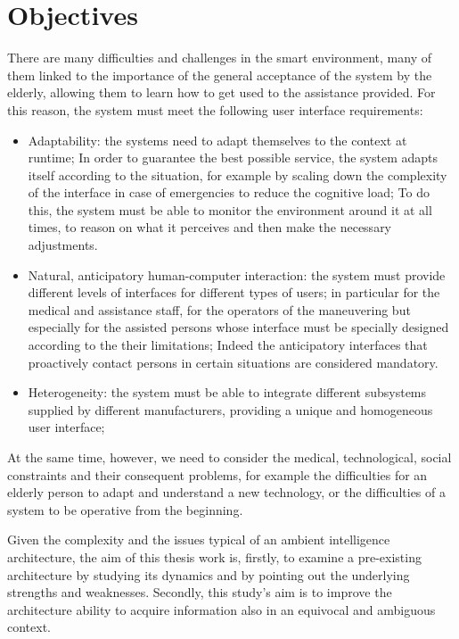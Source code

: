 \documentclass{thesisreport}
\begin{document}
 \section{Objectives}
 There are many difficulties and challenges in the smart environment, many of them linked to the importance of the general acceptance of the system by the elderly, allowing them to learn how to get used to the assistance provided. For this reason, the system must meet the following user interface requirements:
 \begin{itemize}
     \item Adaptability:  the systems need to adapt themselves to the context at runtime;
     In order to guarantee the best possible service, the system adapts itself according to the situation, for example by scaling down the complexity of the interface in case of emergencies to reduce the cognitive load;
     To do this, the system must be able to monitor the environment around it at all times, to reason on what it perceives and then make the necessary adjustments.
     \item  Natural, anticipatory human-computer interaction: the system must provide different levels of interfaces for different types of users; in particular for the medical and assistance staff, for the operators of the maneuvering but especially for the assisted persons whose interface must be specially designed according to the their limitations; 
     Indeed the anticipatory interfaces that proactively contact persons in certain situations are considered mandatory.
     \item Heterogeneity: the system must be able to integrate different subsystems supplied by different manufacturers, providing a unique and homogeneous user interface;
 \end{itemize}
 At the same time, however, we need to consider the medical, technological, social constraints and their consequent problems, for example the difficulties for an elderly person to adapt and understand a new technology, or the difficulties of a system to be operative from the beginning.
 
 Given the complexity and the issues typical of an ambient intelligence architecture, the aim of this thesis work is, firstly, to examine a pre-existing architecture by studying its dynamics and by pointing out the underlying strengths and weaknesses. Secondly, this study’s aim is to improve the architecture ability to acquire information also in an equivocal and ambiguous context.
 
\end{document}
